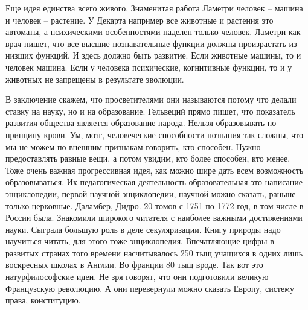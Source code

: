 \documentclass[a4paper, 12pt]{article}
\begin{document}
Еще идея единства всего живого. Знаменитая работа Ламетри человек -- 
машина и человек -- растение. У Декарта например все животные и растения 
это автоматы, а психическими особенностями наделен только человек. 
Ламетри как врач пишет, что все высшие познавательные функции должны 
произрастать из низших функций. И здесь должно быть развитие. Если 
животные машины, то и человек машина. Если у человека психические, 
когнитивные функции, то и у животных не запрещены в результате эволюции.

В заключение скажем, что просветителями они называются потому что делали 
ставку на науку, но и на образование. Гельвеций прямо пишет, что 
показатель развития общества является образование народа. Нельзя 
образовывать по принципу крови. Ум, мозг, человеческие способности 
познания так сложны, что мы не можем по внешним признакам говорить, кто 
способен. Нужно предоставлять равные вещи, а потом увидим, кто более 
способен, кто менее. Тоже очень важная прогрессивная идея, как можно 
шире дать всем возможность образовываться. Их педагогическая 
деятельность образовательная это написание энциклопедии, первой научной 
энциклопедии, научной можно сказать, раньше только церковные. Даламбер, 
Дидро. 20 томов с 1751 по 1772 год, в том числе в России была. Знакомили 
широкого читателя с наиболее важными достижениями науки. Сыграла большую 
роль в деле секуляризации. Книгу природы надо научиться читать, для 
этого тоже энциклопедия. Впечатляющие цифры в развитых странах того 
времени насчитывалось 250 тыщ учащихся в одних лишь воскресных школах 
в Англии. Во франции 80 тыщ вроде. Так вот это натурфилософские идеи. Не 
зря говорят, что они подготовили великую Французскую революцию. А они 
перевернули можно сказать Европу, систему права, конституцию.
\end{document}
